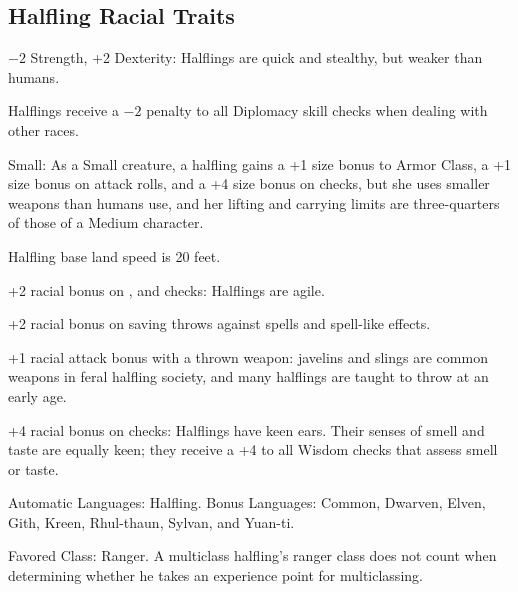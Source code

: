 \subsection{Halfling Racial Traits}
\begin{itemize*}
    \item $-2$ Strength, +2 Dexterity: Halflings are quick and stealthy, but weaker than humans.
    \item Halflings receive a $-2$ penalty to all Diplomacy skill checks when dealing with other races.
    \item Small: As a Small creature, a halfling gains a +1 size bonus to Armor Class, a +1 size bonus on attack rolls, and a +4 size bonus on  checks, but she uses smaller weapons than humans use, and her lifting and carrying limits are three-quarters of those of a Medium character.%
    \item Halfling base land speed is 20 feet.
    \item +2 racial bonus on ,  and  checks: Halflings are agile.
    \item +2 racial bonus on saving throws against spells and spell-like effects.
    \item +1 racial attack bonus with a thrown weapon: javelins and slings are common weapons in feral halfling society, and many halflings are taught to throw at an early age.
    \item +4 racial bonus on  checks: Halflings have keen ears. Their senses of smell and taste are equally keen; they receive a +4 to all Wisdom checks that assess smell or taste.
    \item Automatic Languages: Halfling. Bonus Languages: Common, Dwarven, Elven, Gith, Kreen, Rhul-thaun, Sylvan, and Yuan-ti.
    \item Favored Class: Ranger. A multiclass halfling's ranger class does not count when determining whether he takes an experience point for multiclassing.
\end{itemize*}